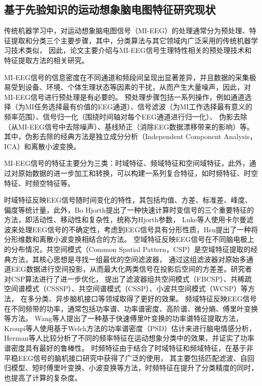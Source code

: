 \subsection{基于先验知识的运动想象脑电图特征研究现状}

传统机器学习中，对运动想象脑电图信号（MI-EEG）的处理通常分为预处理、特征提取和分类三个主要步骤\cite{altaheri2023deep}，其中，分类算法与其它领域内广泛采用的传统机器学习技术类似，
因此，论文主要介绍与MI-EEG信号生理特性相关的预处理技术和特征提取方法的相关研究。

MI-EEG信号的信息密度在不同通道和频段间呈现出显著差异，并且数据的采集极易受到设备、环境、个体生理状态等因素的干扰，从而产生大量噪声，因此，对MI-EEG信号进行预处理是有必要的。
预处理步骤包括一系列操作，例如通道选择（为MI任务选择最有价值的EEG通道）、信号滤波（为MI工作选择最有意义的频率范围）、信号归一化（围绕时间轴对每个EEG通道进行归一化）、
伪影去除（从MI-EEG信号中去除噪声）\cite{altaheri2023deep}、基线矫正（消除EEG数据漂移带来的影响）等。
其中，伪影去除的经典方法是独立成分分析（Independent Component Analysis，ICA）和离散小波变换\cite{sai2017automated}。

MI-EEG信号的特征主要分为三类：时域特征、频域特征和空间域特征\cite{altaheri2023deep}，此外，通过对原始数据的进一步加工和转换，可以构建一系列复合特征，如时频特征、时空特征、时频空特征等。

时域特征反映EEG信号随时间变化的特性，其包括均值、方差、标准差、峰度、偏度等统计量，此外，Bo Hjorth提出了一种快速计算时变信号的三个重要特征的方法，即活动性、移动性和复杂性，统称为Hjorth参数\cite{HJORTH1970306}，
Luke等人使用卡尔曼滤波来处理EEG信号的不确定性\cite{7448410}，考虑到EEG信号具有分形性质，Hsu提出了一种将分形维数和离散小波变换相结合的方法\cite{HSU2010295}。
空域特征反映EEG信号在不同脑电极上的分布情况，共空间模式（Common Spatial Pattern，CSP）是空域特征提取的经典方法，其核心思想是寻找一组最优的空间滤波器，
通过这组滤波器对原始多通道EEG数据进行空间投影，从而最大化两类信号在投影后空间的方差差\cite{wang2006common}。研究者对CSP算法进行了进一步优化，
提出了滤波器组共空间模式（FBCSP）\cite{ang2008filter}、共稀疏空间谱模式（CSSSP）\cite{dornhege2006combined}、共空间谱模式（CSSP）\cite{lemm2005spatio}、小波共空间模式（WCSP）\cite{mousavi2011wavelet}等方法，
在多分类、异步脑机接口等领域取得了更好的效果。
频域特征反映EEG信号在不同频带的功率，通常包括功率谱、功率谱密度、高阶谱、微分熵、傅里叶变换等方法。
Wang等人提出了一种基于快速傅里叶变换的功率谱特征提取方法\cite{wang2017tinnitus}，Kroupi等人使用基于Welch方法的功率谱密度（PSD）估计来进行脑电情感分析\cite{kroupi2011eeg}，
Herman等人比较分析了不同的频率特征在运动想象分类中的效果，并证实了功率谱密度具有最好的鲁棒性\cite{herman2008comparative}。
时频特征由于结合了时域特征和频域特征，在基于非平稳EEG信号的脑机接口研究中获得了广泛的使用\cite{pawar2020feature}，
其主要包括匹配滤波、自回归模型、短时傅里叶变换、小波变换等方法，时频特征在提升了分类精度的同时，也提高了计算的复杂度。

